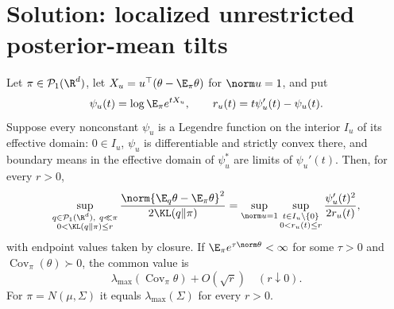 \documentclass[../main.tex]{subfiles}
\begin{document}

\section*{Solution: localized unrestricted posterior-mean tilts}

\begin{theorem}
Let $\pi\in\mathcal P_1(\R^d)$, let
$X_u=u^\top(\theta-\E_\pi\theta)$ for $\norm u=1$, and put
\[
 \psi_u(t)=\log\E_\pi e^{tX_u},\qquad
 r_u(t)=t\psi_u'(t)-\psi_u(t).
\]
Suppose every nonconstant $\psi_u$ is a Legendre function on the interior $I_u$ of its
effective domain: $0\in I_u$, $\psi_u$ is differentiable and strictly convex there, and
boundary means in the effective domain of $\psi_u^*$ are limits of $\psi_u'(t)$. Then, for
every $r>0$,
\[
 \sup_{\substack{q\in\mathcal P_1(\R^d),\ q\ll\pi\\0<\KL(q\|\pi)\le r}}
 \frac{\norm{\E_q\theta-\E_\pi\theta}^2}{2\KL(q\|\pi)}
 =\sup_{\norm u=1}\sup_{\substack{t\in I_u\setminus\{0\}\\0<r_u(t)\le r}}
 \frac{\psi_u'(t)^2}{2r_u(t)},
\]
with endpoint values taken by closure. If
$\E_\pi e^{\tau\norm\theta}<\infty$ for some $\tau>0$ and
$\operatorname{Cov}_\pi(\theta)\succ0$, the common value is
\[
 \lambda_{\max}(\operatorname{Cov}_\pi\theta)+O(\sqrt r)
 \quad(r\downarrow0).
\]
For $\pi=N(\mu,\Sigma)$ it equals $\lambda_{\max}(\Sigma)$ for every $r>0$.
\end{theorem}
\end{document}
